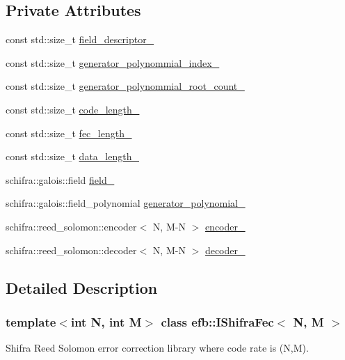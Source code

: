 \subsection*{Private Attributes}
\begin{DoxyCompactItemize}
\item 
const std::size\_\-t \hyperlink{classefb_1_1IShifraFec_aab1a6051362d9a8b9dc1bf66162743ba}{field\_\-descriptor\_\-}
\item 
const std::size\_\-t \hyperlink{classefb_1_1IShifraFec_a0151caad93dcee8fd76042845c7761d1}{generator\_\-polynommial\_\-index\_\-}
\item 
const std::size\_\-t \hyperlink{classefb_1_1IShifraFec_a187b4bde8c8d1626ee351ad9d8a10efb}{generator\_\-polynommial\_\-root\_\-count\_\-}
\item 
const std::size\_\-t \hyperlink{classefb_1_1IShifraFec_aec880d94a65f32e64736d21ecc62caee}{code\_\-length\_\-}
\item 
const std::size\_\-t \hyperlink{classefb_1_1IShifraFec_a560cb28c8a918c24356967a3c35604ad}{fec\_\-length\_\-}
\item 
const std::size\_\-t \hyperlink{classefb_1_1IShifraFec_a780eb0b73c725bab3470002b4746d07e}{data\_\-length\_\-}
\item 
schifra::galois::field \hyperlink{classefb_1_1IShifraFec_a770e111002e7a8b19041c4f3a972b2c1}{field\_\-}
\item 
schifra::galois::field\_\-polynomial \hyperlink{classefb_1_1IShifraFec_a80fe940d7742c12811d27cbb50d605dc}{generator\_\-polynomial\_\-}
\item 
schifra::reed\_\-solomon::encoder$<$ N, M-\/N $>$ \hyperlink{classefb_1_1IShifraFec_a48add19c7145ddef42b214f772508c0f}{encoder\_\-}
\item 
schifra::reed\_\-solomon::decoder$<$ N, M-\/N $>$ \hyperlink{classefb_1_1IShifraFec_acddab8a0f72a511d8b03ffecfe77735a}{decoder\_\-}
\end{DoxyCompactItemize}


\subsection{Detailed Description}
\subsubsection*{template$<$int N, int M$>$ class efb::IShifraFec$<$ N, M $>$}

Shifra Reed Solomon error correction library where code rate is (N,M). 

